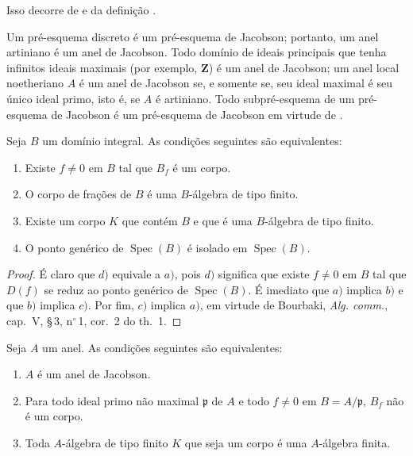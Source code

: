 Isso decorre de  e da definição .

\begin{env}[10.4.3]
\label{IV.10.4.3}
Um pré-esquema discreto é um pré-esquema de Jacobson; portanto, um anel artiniano é um anel de Jacobson.
Todo domínio de ideais principais que tenha infinitos ideais maximais (por exemplo, $\mathbf{Z}$) é um anel de Jacobson; um anel local noetheriano $A$ é um anel de Jacobson se, e somente se, seu ideal maximal é seu único ideal primo, isto é, se $A$ é artiniano.
Todo subpré-esquema de um pré-esquema de Jacobson é um pré-esquema de Jacobson em virtude de .
\end{env}

\begin{proposition}[10.4.4]
\label{IV.10.4.4}
Seja $B$ um domínio integral.
As condições seguintes são equivalentes:
\begin{enumerate}[label=\emph{\alph*)}]
  \item Existe $f\neq 0$ em $B$ tal que $B_f$ é um corpo.
  \item O corpo de frações de $B$ é uma $B$-álgebra de tipo finito.
  \item Existe um corpo $K$ que contém $B$ e que é uma $B$-álgebra de tipo finito.
  \item O ponto genérico de $\operatorname{Spec}(B)$ é isolado em $\operatorname{Spec}(B)$.
\end{enumerate}
\end{proposition}

\begin{proof}
É claro que $d)$ equivale a $a)$, pois $d)$ significa que existe $f\neq 0$ em $B$ tal que $D(f)$ se reduz ao ponto genérico de $\operatorname{Spec}(B)$.
É imediato que $a)$ implica $b)$ e que $b)$ implica $c)$.
Por fim, $c)$ implica $a)$, em virtude de Bourbaki, \emph{Alg. comm.}, cap.~V, \S\,3, n$^\circ$\,1, cor.~2 do th.~1.
\end{proof}

\begin{proposition}[10.4.5]
\label{IV.10.4.5}
Seja $A$ um anel.
As condições seguintes são equivalentes:
\begin{enumerate}[label=\emph{\alph*)}]
  \item $A$ é um anel de Jacobson.
  \item Para todo ideal primo não maximal $\mathfrak{p}$ de $A$ e todo $f\neq 0$ em $B=A/\mathfrak{p}$, $B_f$ não é um corpo.
  \item[\rm b$'$)] Toda $A$-álgebra de tipo finito $K$ que seja um corpo é uma $A$-álgebra finita.
\end{enumerate}
\end{proposition}

